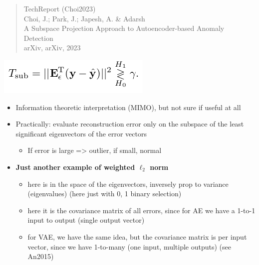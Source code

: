 \documentclass[
  letterpaper,
  DIV=11,
  numbers=noendperiod]{scrartcl}
\providecommand{\tightlist}{%
  \setlength{\itemsep}{0pt}\setlength{\parskip}{0pt}}\usepackage{longtable,booktabs,array}
\begin{document}
\begin{quote}
TechReport (Choi2023)\\
Choi, J.; Park, J.; Japesh, A. \& Adarsh\\
A Subspace Projection Approach to Autoencoder-based Anomaly Detection\\
arXiv, arXiv, 2023
\end{quote}

\includegraphics{img/2023-02-27-10-13-03.png}

\begin{itemize}
\tightlist
\item
  Information theoretic interpretation (MIMO), but not sure if useful at
  all
\item
  Practically: evaluate reconstruction error only on the subspace of the
  least significant eigenvectors of the error vectors

  \begin{itemize}
  \tightlist
  \item
    If error is large =\textgreater{} outlier, if small, normal
  \end{itemize}
\item
  \textbf{Just another example of weighted \(\ell_2\) norm}

  \begin{itemize}
  \tightlist
  \item
    here is in the space of the eigenvectors, inversely prop to variance
    (eigenvalues) (here just with 0, 1 binary selection)
  \item
    here it is the covariance matrix of all errors, since for AE we have
    a 1-to-1 input to output (single output vector)
  \item
    for VAE, we have the same idea, but the covariance matrix is per
    input vector, since we have 1-to-many (one input, multiple outputs)
    (see An2015)
  \end{itemize}
\end{itemize}
\end{document}
